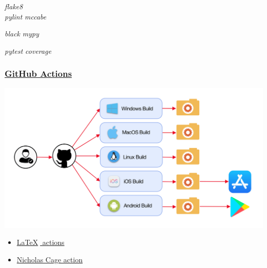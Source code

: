 \begin{frame}
    \centering
    
    \color{blue}

    \textit{flake8} \\
    \vspace{0.3cm}
    \textit{pylint} \qquad \qquad \textit{mccabe} \\
    \vspace{0.2cm}

    \vspace{0.8cm}
    \textit{black} \qquad {} \qquad \qquad \textit{mypy}

    \vspace{0.8cm}
    \textit{pytest} \qquad \qquad \textit{coverage}


\end{frame}


\begin{frame}
    \frametitle{\href{https://github.com/11michalis11/AmbulanceDecisionGame/blob/master/.github/workflows/config.yml}{GitHub Actions}}
    \centering

    \includegraphics[width=\textwidth]{Bin/github_actions.png}

    \pause
    
    \begin{itemize}
        \item \href{https://github.com/11michalis11/ED-EMS-game-paper}{\LaTeX \(\;\) actions}
        \item \href{https://twitter.com/tartanllama/status/1163927778376462337}{Nicholas Cage action}
    \end{itemize}

\end{frame}

